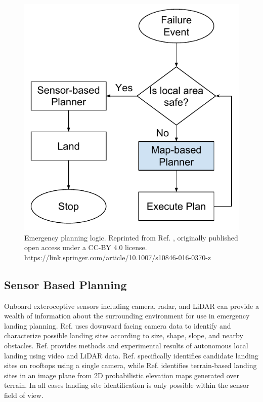 \begin{figure}[ht]
\includegraphics[scale=.65]{chapter_5_mapping/imgs/meta-level-planner.pdf}
\centering
\caption[Simplified flow chart for emergency landing]{Emergency planning logic. Reprinted from Ref. \cite{ten_harmsel_emergency_2017}, originally published open access under a CC-BY 4.0 license. https://link.springer.com/article/10.1007/s10846-016-0370-z}
\label{fig:ch5_meta-level-planner}       %
\end{figure}



\subsection{Sensor Based Planning}\label{sec:ch5_local_sensor}
Onboard exteroceptive sensors including camera, radar, and LiDAR can provide a wealth of information about the surrounding environment for use in emergency landing planning. Ref. \cite{warren_enabling_2015} uses downward facing camera data to identify and characterize possible landing sites according to size, shape, slope, and nearby obstacles.
Ref. \cite{theodore_flight_2006} provides methods and experimental results of autonomous local landing using video and LiDAR data. Ref. \cite{desaraju_vision-based_2015} specifically identifies candidate landing sites on rooftops using a single camera, while Ref. \cite{forster_continuous_2015} identifies terrain-based landing sites in an image plane from 2D probabilistic elevation maps generated over terrain. In all cases landing site identification is only possible within the sensor field of view.

